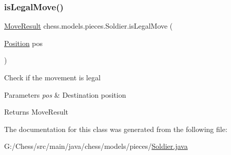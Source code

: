 \subsubsection{\texorpdfstring{is\+Legal\+Move()}{isLegalMove()}}
{\footnotesize\ttfamily \mbox{\hyperlink{enumchess_1_1models_1_1enums_1_1_move_result}{Move\+Result}} chess.\+models.\+pieces.\+Soldier.\+is\+Legal\+Move (\begin{DoxyParamCaption}\item[{\mbox{\hyperlink{classchess_1_1models_1_1_position}{Position}}}]{pos }\end{DoxyParamCaption})}

Check if the movement is legal


\begin{DoxyParams}{Parameters}
{\em pos} & Destination position \\
\hline
\end{DoxyParams}
\begin{DoxyReturn}{Returns}
Move\+Result 
\end{DoxyReturn}


The documentation for this class was generated from the following file\+:\begin{DoxyCompactItemize}
\item 
G\+:/\+Chess/src/main/java/chess/models/pieces/\mbox{\hyperlink{_soldier_8java}{Soldier.\+java}}\end{DoxyCompactItemize}
